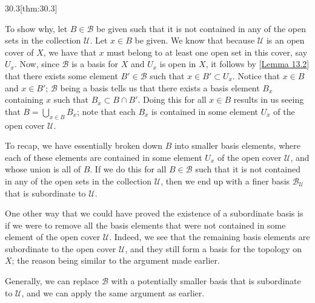 \begin{thmBox}{30.3}[thm:30.3]
\begin{proofBox}
        To show why, let \( B \in \mathcal{B} \) be given such that it is not
        contained in any of the open sets in the collection \( \mathcal{U} \).
        Let \( x \in B \) be given.
        We know that because \( \mathcal{U} \) is an open cover of \( X \),
        we have that \( x \) must belong to at least one open set in this
        cover, say \( U_{ x } \).
        Now, since \( \mathcal{B} \) is a basis for \( X \) and \( U_{ x } \)
        is open in \( X \), it follows by [\hyperlink{lem:13.2}{Lemma 13.2}]
        that there exists some element \( B' \in \mathcal{B} \) such that
        \( x \in B' \subset U_{ x } \).
        Notice that \( x \in B \) and \( x \in B' \); \( \mathcal{B} \) being a 
        basis tells us that there exists a basis element \( B_{ x } \) 
        containing \( x \) such that \( B_{ x } \subset B \cap B' \).
        Doing this for all \( x \in B \) results in us seeing that 
        \( B = \bigcup_{ x \in B } B_{ x } \); note that each \( B_{ x } \)
        is contained in some element \( U_{ x } \) of the open cover
        \( \mathcal{U} \).
        
        \baseSkip

        To recap, we have essentially broken down \( B \) into smaller basis
        elements, where each of these elements are contained in some element
        \( U_{ x } \) of the open cover \( \mathcal{U} \), and whose union
        is all of \( B \).
        If we do this for all \( B \in \mathcal{B} \) such that it is not
        contained in any of the open sets in the collection \( \mathcal{U} \),
        then we end up with a finer basis \( \mathcal{B}_{ \mathcal{U} } \)
        that is subordinate to \( \mathcal{U} \).

        \baseSkip 

        One other way that we could have proved the existence of a subordinate basis 
        is if we were to remove all the basis elements that were not contained in some 
        element of the open cover \( \mathcal{U} \).
        Indeed, we see that the remaining basis elements are subordinate to the open 
        cover \( \mathcal{U} \), and they still form a basis for the topology on 
        \( X \); the reason being similar to the argument made earlier.

        \baseSkip

        Generally, we can replace \( \mathcal{B} \) with a potentially smaller
        basis that is subordinate to \( \mathcal{U} \), and we can apply the 
        same argument as earlier.


\end{proofBox}
\end{thmBox}
